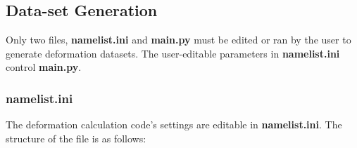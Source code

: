 \documentclass{article}
\begin{document}
    \subsection{Data-set Generation}

        Only two files, \textbf{namelist.ini} and \textbf{main.py} must be edited or ran by the user to generate deformation datasets. The user-editable parameters in \textbf{namelist.ini} control \textbf{main.py}.

        \subsubsection{\textbf{namelist.ini}}

        The deformation calculation code's settings are editable in \textbf{namelist.ini}. The structure of the file is as follows:
\end{document}
